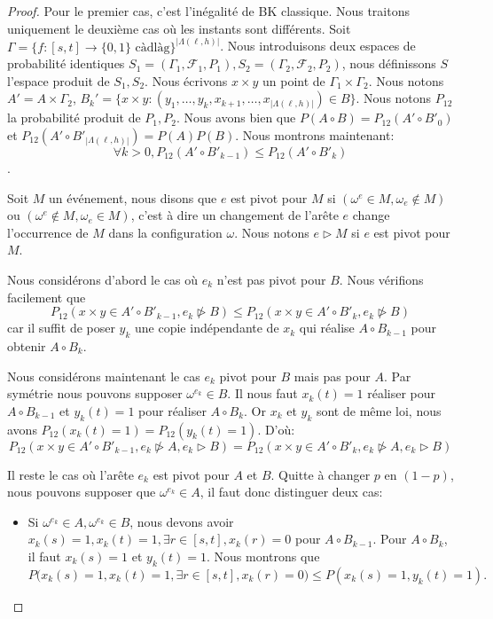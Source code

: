 \documentclass[titlepage,a4paper,12pt]{article}
\begin{document}
\begin{proof}
Pour le premier cas, c'est l'inégalité de BK classique. Nous traitons uniquement le deuxième cas où les instants sont différents. Soit $\Gamma = \{f:[s,t]\rightarrow\{0,1\}\text{ càdlàg} \}^{|\Lambda(\ell,h)|}$. Nous introduisons deux espaces de probabilité identiques $S_1 = (\Gamma_1,\mathcal{F}_1,P_1), S_2 = (\Gamma_2,\mathcal{F}_2,P_2)$, nous définissons $S$ l'espace produit de $S_1,S_2$. Nous écrivons $x\times y$ un point de $\Gamma_1 \times \Gamma_2$. Nous notons $A' = A\times \Gamma_2$, $B_k' = \{x\times y :(y_1,\dots,y_k,x_{k+1},\dots,x_{|\Lambda(\ell,h)|}) \in B\}$. Nous notons $P_{12}$ la probabilité produit de $P_1,P_2$. Nous avons bien que $P(A\circ B) = P_{12}(A'\circ B'_0)$ et $P_{12}(A'\circ B'_{|\Lambda(\ell,h)|}) = P(A)P(B)$. Nous montrons maintenant: $$\forall k>0, P_{12}(A'\circ B'_{k-1}) \leqslant P_{12}(A'\circ B'_k)$$. 

Soit $M$ un événement, nous disons que $e$ est pivot pour $M$ si $(\omega^e \in M, \omega_e\notin M)$ ou $(\omega^e \notin M, \omega_e\in M)$, c'est à dire un changement de l'arête $e$ change l'occurrence de $M$ dans la configuration $\omega$. Nous notons $e\triangleright M$ si $e$ est pivot pour $M$.

Nous considérons d'abord le cas où $e_k$ n'est pas pivot pour $B$. Nous vérifions facilement que 
$$ P_{12}(x\times y \in A'\circ B'_{k-1}, e_k \ntriangleright B) \leqslant P_{12}(x\times y \in A'\circ B'_k,e_k \ntriangleright B)
$$
car il suffit de poser $y_k$ une copie indépendante de $x_k$ qui réalise $A\circ B_{k-1}$ pour obtenir $A\circ B_k$.

Nous considérons maintenant le cas $e_k$ pivot pour $B$ mais pas pour $A$. Par symétrie nous pouvons supposer $ \omega^{e_k}\in B$. Il nous faut $x_k(t)=1$ réaliser pour $A\circ B_{k-1}$ et $y_k(t)= 1$ pour réaliser $A\circ B_k$. Or $x_k$ et $y_k$ sont de même loi, nous avons $P_{12}(x_k(t)=1) = P_{12}(y_k(t)=1)$. D'où:
$$P_{12}(x\times y \in A'\circ B'_{k-1}, e_k \ntriangleright A,e_k \triangleright B) = P_{12}(x\times y \in A'\circ B'_k,e_k \ntriangleright A, e_k \triangleright B)
$$

Il reste le cas où l'arête $e_k$ est pivot pour $A$ et $B$. Quitte à changer $p$ en $(1-p)$, nous pouvons supposer que $\omega^{e_k}\in A$, il faut donc distinguer deux cas:
\begin{itemize}[label = $\bullet$, leftmargin = *]
\item Si $\omega^{e_k}\in A, \omega^{e_k}\in B$, nous devons avoir $x_k(s) = 1, x_k(t) =1, \exists r\in [s,t], x_k(r) = 0$ pour $A\circ B_{k-1}$. Pour $A\circ B_k$, il faut $x_k(s)=1$ et $y_k(t)=1$. Nous montrons que $$P\big(x_k(s) = 1, x_k(t) =1, \exists r\in [s,t], x_k(r) = 0\big)\leqslant P(x_k(s)=1,y_k(t)=1).$$


\end{itemize}
\end{proof}
\end{document}
